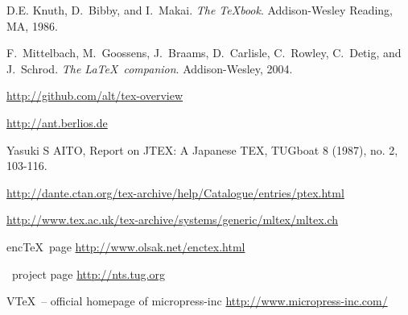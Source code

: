 \documentclass{scrartcl}
\begin{document}
\clearpage
\normalsize
\begin{thebibliography}{10}
\label{sec:refs}

	\vspace{2ex}
	\vspace{1ex}
	D.E. Knuth, D.~Bibby, and I.~Makai.
	\newblock \emph{{The \TeX book}}.
	\newblock Addison-Wesley Reading, MA, 1986.
	
	F.~Mittelbach, M.~Goossens, J.~Braams, D.~Carlisle, C.~Rowley, C.~Detig, and
	  J.~Schrod.
	\newblock \emph{{The \LaTeX\ companion}}.
	\newblock Addison-Wesley, 2004.
	
	\vspace{2ex}
	\newblock \url{http://github.com/alt/tex-overview}

	\vspace{1ex}
	\vspace{1ex}

	\newblock \url{http://ant.berlios.de}
	
	\newblock Yasuki S AITO, Report on JTEX: A Japanese TEX, TUGboat 8 (1987), no. 2, 103-116.

	\newblock\url{http://dante.ctan.org/tex-archive/help/Catalogue/entries/ptex.html}

	\newblock \url{http://www.tex.ac.uk/tex-archive/systems/generic/mltex/mltex.ch}
	
	{enc\TeX\ page}
	\newblock \url{http://www.olsak.net/enctex.html}
	
	{\NTS\ project page}
	\newblock \url{http://nts.tug.org}
	
	{V\TeX\ – official homepage of micropress-inc}
	\newblock \url{http://www.micropress-inc.com/}
	

\end{thebibliography}
\end{document}
